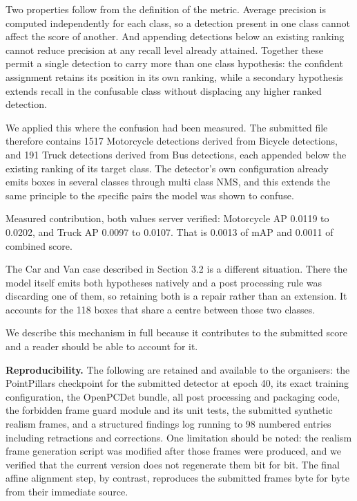 \documentclass[
  10pt,
]{article}
\begin{document}
Two properties follow from the definition of the metric. Average
precision is computed independently for each class, so a detection
present in one class cannot affect the score of another. And appending
detections below an existing ranking cannot reduce precision at any
recall level already attained. Together these permit a single detection
to carry more than one class hypothesis: the confident assignment
retains its position in its own ranking, while a secondary hypothesis
extends recall in the confusable class without displacing any higher
ranked detection.

We applied this where the confusion had been measured. The submitted
file therefore contains 1517 Motorcycle detections derived from Bicycle
detections, and 191 Truck detections derived from Bus detections, each
appended below the existing ranking of its target class. The detector's
own configuration already emits boxes in several classes through multi
class NMS, and this extends the same principle to the specific pairs the
model was shown to confuse.

Measured contribution, both values server verified: Motorcycle AP 0.0119
to 0.0202, and Truck AP 0.0097 to 0.0107. That is 0.0013 of mAP and
0.0011 of combined score.

The Car and Van case described in Section 3.2 is a different situation.
There the model itself emits both hypotheses natively and a post
processing rule was discarding one of them, so retaining both is a
repair rather than an extension. It accounts for the 118 boxes that
share a centre between those two classes.

We describe this mechanism in full because it contributes to the
submitted score and a reader should be able to account for it.

\textbf{Reproducibility.} The following are retained and available to
the organisers: the PointPillars checkpoint for the submitted detector
at epoch 40, its exact training configuration, the OpenPCDet bundle, all
post processing and packaging code, the forbidden frame guard module and
its unit tests, the submitted synthetic realism frames, and a structured
findings log running to 98 numbered entries including retractions and
corrections. One limitation should be noted: the realism frame
generation script was modified after those frames were produced, and we
verified that the current version does not regenerate them bit for bit.
The final affine alignment step, by contrast, reproduces the submitted
frames byte for byte from their immediate source.
\end{document}
